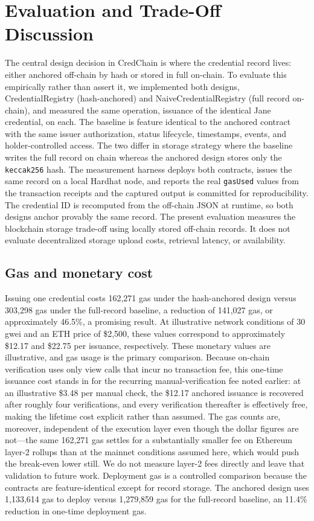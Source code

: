 \documentclass[conference]{IEEEtran}
\begin{document}
\section{Evaluation and Trade-Off Discussion}

The central design decision in CredChain is where the credential record lives: either anchored off-chain by hash or stored in full on-chain. To evaluate this empirically rather than assert it, we implemented both designs, CredentialRegistry (hash-anchored) and NaiveCredentialRegistry (full record on-chain), and measured the same operation, issuance of the identical Jane credential, on each. The baseline is feature identical to the anchored contract with the same issuer authorization, status lifecycle, timestamps, events, and holder-controlled access. The two differ in storage strategy where the baseline writes the full record on chain whereas the anchored design stores only the \texttt{keccak256} hash. The measurement harness deploys both contracts, issues the same record on a local Hardhat node, and reports the real \texttt{gasUsed} values from the transaction receipts and the captured output is committed for reproducibility. The credential ID is recomputed from the off-chain JSON at runtime, so both designs anchor provably the same record. The present evaluation measures the blockchain storage trade-off using locally stored off-chain records. It does not evaluate decentralized storage upload costs, retrieval latency, or availability.

\subsection{Gas and monetary cost}
Issuing one credential costs 162,271 gas under the hash-anchored design versus 303,298 gas under the full-record baseline, a reduction of 141,027 gas, or approximately 46.5\%, a promising result. At illustrative network conditions of 30 gwei and an ETH price of \$2,500, these values correspond to approximately \$12.17 and \$22.75 per issuance, respectively. These monetary values are illustrative, and gas usage is the primary comparison. Because on-chain verification uses only view calls that incur no transaction fee, this one-time issuance cost stands in for the recurring manual-verification fee noted earlier: at an illustrative \$3.48 per manual check, the \$12.17 anchored issuance is recovered after roughly four verifications, and every verification thereafter is effectively free, making the lifetime cost explicit rather than assumed. The gas counts are, moreover, independent of the execution layer even though the dollar figures are not---the same 162,271 gas settles for a substantially smaller fee on Ethereum layer-2 rollups than at the mainnet conditions assumed here, which would push the break-even lower still. We do not measure layer-2 fees directly and leave that validation to future work. Deployment gas is a controlled comparison because the contracts are feature-identical except for record storage. The anchored design uses 1,133,614 gas to deploy versus 1,279,859 gas for the full-record baseline, an 11.4\% reduction in one-time deployment gas.
\end{document}
